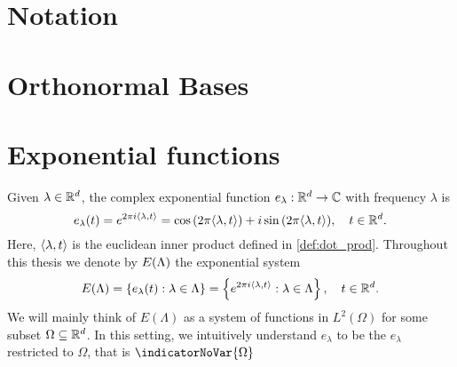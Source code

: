 \documentclass[../thesis.tex]{subfiles}
\begin{document}
\section{Notation}
    

\section{Orthonormal Bases}
    


\section{Exponential functions}
Given $\lambda \in \mathbb{R}^d$, the complex exponential function $e_{\lambda}: \mathbb{R}^d \rightarrow \mathbb{C}$ with frequency $\lambda$ is 
\begin{equation}
    e_{\lambda}(t) = e^{2 \pi i \langle \lambda, t \rangle} = \cos{(2 \pi \langle \lambda, t \rangle)} + i \sin{(2 \pi \langle \lambda, t \rangle)}, \quad t\in \mathbb{R}^d.
\end{equation}
Here, $\langle \lambda, t \rangle$ is the euclidean inner product defined in \cref{def:dot_prod}. Throughout this thesis we denote by $E(\Lambda)$ the exponential system
\begin{align} %
    E\brac{\Lambda} = \braqMed{e_\lambda(t) : \lambda \in \Lambda} = \braqMed{e^{2\pi i \inpl{t}} : \lambda \in \Lambda}, \quad t\in \R^d.
\end{align}
We will mainly think of $E(\Lambda)$ as a system of functions in $L^2(\Omega)$ for some subset $\Omega \subseteq \mathbb{R}^d$. In this setting, we intuitively understand $e_\lambda$ to be the $e_\lambda$ restricted to $\Omega$, that is $\indicatorNoVar{\Omega}$
\end{document}
